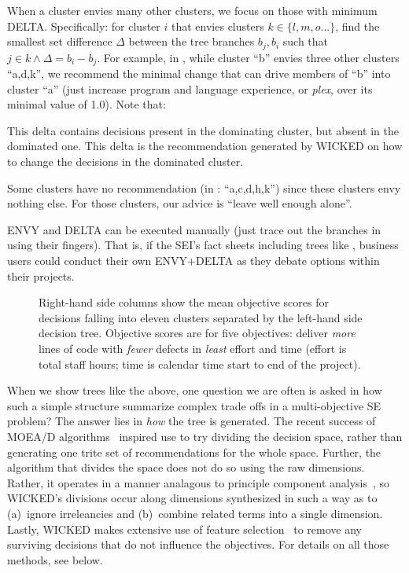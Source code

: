 When a cluster envies many other clusters, we focus on those
 with  minimum DELTA. Specifically: for
cluster $i$ that envies clusters
$k\in \{l,m,o...\}$, find the smallest set
difference $\Delta$ between the tree branches
$b_j,b_i$ such that \mbox{$j\in k \wedge \Delta=b_i -
b_j$}.  
For example, in , while cluster ``b''
envies three other clusters ``a,d,k'', we recommend
the minimal change that can drive members of ``b''
into cluster ``a'' (just increase program and
language experience, or {\em plex}, over its minimal
value of 1.0). 
Note that:
\bi
\item This delta contains decisions present in the dominating cluster,
but absent in the dominated one. This delta is the recommendation generated by WICKED
on how to change the decisions in the dominated cluster.
\item Some clusters
have no recommendation (in : ``a,c,d,h,k'') since these
clusters envy nothing else. For those clusters, our advice is ``leave well enough alone''.
\item
ENVY and DELTA can be executed manually (just trace out the branches in  using their fingers). That is, if the SEI's fact
sheets including trees like , business
users could conduct their own ENVY+DELTA  as they
debate options within their projects.
\ei
\begin{figure}[!t]

\caption{Right-hand side columns show the mean objective scores for decisions falling into eleven clusters
separated by the left-hand side decision tree. Objective scores are for  five objectives:
deliver {\em more} lines of code with {\em fewer} defects in {\em least} effort and time
(effort is total staff hours; time is calendar time start to end of the project).}\label{fig:egree}
\end{figure}
When we show trees like the above, one question we
are often is asked in how such a simple structure
summarize complex trade offs in a 
multi-objective SE problem? The answer lies in {\em how} the tree is generated.
The recent success of MOEA/D algorithms~\cite{zhang07:TEC} inspired use to try dividing the decision
space, rather than generating one trite set of recommendations for the whole space.
Further, the algorithm that divides the space does not do so using the raw dimensions.
Rather, it operates in a manner analagous to principle component analysis~\cite{pearson1901}, so
WICKED's
divisions occur along  dimensions synthesized in such a way as to (a)~ignore
irreleancies and (b)~combine related terms into a single dimension. Lastly,
WICKED makes extensive use of feature selection~\cite{pearson1901} to remove any surviving decisions
that do not influence the objectives. For details on all those methods, see below.
